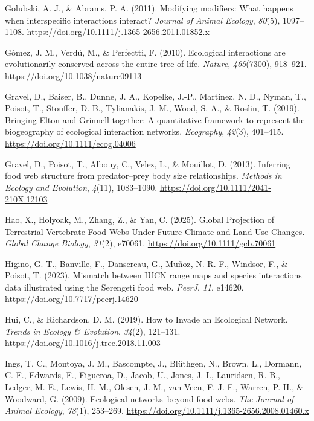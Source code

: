 \documentclass[
]{article}
\newlength{\cslhangindent}
\newenvironment{CSLReferences}[2] %
 {\begin{list}{}{%
  \setlength{\itemindent}{0pt}
  \setlength{\leftmargin}{0pt}
  \setlength{\parsep}{0pt}
  \ifodd #1
   \setlength{\leftmargin}{\cslhangindent}
   \setlength{\itemindent}{-1\cslhangindent}
  \fi
  \setlength{\itemsep}{#2\baselineskip}}}
 {\end{list}}
\begin{document}
\begin{CSLReferences}{1}{0}
Golubski, A. J., \& Abrams, P. A. (2011). Modifying modifiers: What
happens when interspecific interactions interact? \emph{Journal of
Animal Ecology}, \emph{80}(5), 1097--1108.
\url{https://doi.org/10.1111/j.1365-2656.2011.01852.x}

Gómez, J. M., Verdú, M., \& Perfectti, F. (2010). Ecological
interactions are evolutionarily conserved across the entire tree of
life. \emph{Nature}, \emph{465}(7300), 918--921.
\url{https://doi.org/10.1038/nature09113}

Gravel, D., Baiser, B., Dunne, J. A., Kopelke, J.-P., Martinez, N. D.,
Nyman, T., Poisot, T., Stouffer, D. B., Tylianakis, J. M., Wood, S. A.,
\& Roslin, T. (2019). Bringing {Elton} and {Grinnell} together: A
quantitative framework to represent the biogeography of ecological
interaction networks. \emph{Ecography}, \emph{42}(3), 401--415.
\url{https://doi.org/10.1111/ecog.04006}

Gravel, D., Poisot, T., Albouy, C., Velez, L., \& Mouillot, D. (2013).
Inferring food web structure from predator--prey body size
relationships. \emph{Methods in Ecology and Evolution}, \emph{4}(11),
1083--1090. \url{https://doi.org/10.1111/2041-210X.12103}

Hao, X., Holyoak, M., Zhang, Z., \& Yan, C. (2025). Global {Projection}
of {Terrestrial Vertebrate Food Webs Under Future Climate} and {Land-Use
Changes}. \emph{Global Change Biology}, \emph{31}(2), e70061.
\url{https://doi.org/10.1111/gcb.70061}

Higino, G. T., Banville, F., Dansereau, G., Muñoz, N. R. F., Windsor,
F., \& Poisot, T. (2023). Mismatch between {IUCN} range maps and species
interactions data illustrated using the {Serengeti} food web.
\emph{PeerJ}, \emph{11}, e14620.
\url{https://doi.org/10.7717/peerj.14620}

Hui, C., \& Richardson, D. M. (2019). How to {Invade} an {Ecological
Network}. \emph{Trends in Ecology \& Evolution}, \emph{34}(2), 121--131.
\url{https://doi.org/10.1016/j.tree.2018.11.003}

Ings, T. C., Montoya, J. M., Bascompte, J., Blüthgen, N., Brown, L.,
Dormann, C. F., Edwards, F., Figueroa, D., Jacob, U., Jones, J. I.,
Lauridsen, R. B., Ledger, M. E., Lewis, H. M., Olesen, J. M., van Veen,
F. J. F., Warren, P. H., \& Woodward, G. (2009). Ecological
networks--beyond food webs. \emph{The Journal of Animal Ecology},
\emph{78}(1), 253--269.
\url{https://doi.org/10.1111/j.1365-2656.2008.01460.x}


\end{CSLReferences}
\end{document}
